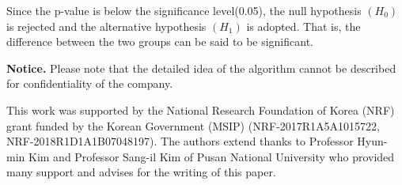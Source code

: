 Since the p-value is below the significance level(0.05), the null hypothesis $(H_{0})$ is rejected and the alternative hypothesis $(H_{1})$ is adopted. That is, the difference between the two groups can be said to be significant.

{\bf Notice.} Please note that the detailed idea of the algorithm cannot be described for confidentiality of the company.

%


\begin{acknowledgements}
This work was supported by the National Research Foundation of Korea (NRF)
grant funded by the Korean Government (MSIP) (NRF-2017R1A5A1015722, NRF-2018R1D1A1B07048197). 
The authors extend thanks to Professor Hyun-min Kim and Professor Sang-il Kim of Pusan National University who provided many support and advises for the writing of this paper.
\end{acknowledgements}

